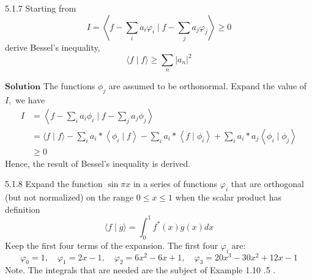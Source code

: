 \documentclass{article}
\begin{document}
\begin{flushleft}
\newpage



\begin{mybox}{5.1.7}
Starting from 
$$I=\left\langle f-\sum_{i} a_{i} \varphi_{i} \mid f-\sum_{j} a_{j} \varphi_{j}\right\rangle \geq 0$$
derive Bessel's inequality, 
$$\langle f \mid f\rangle \geq \sum_{n}\left|a_{n}\right|^{2}$$
\end{mybox}

$\boxed{\textbf{Solution}}$ The functions $\phi_{j}$ are assumed to be orthonormal.
Expand the value of $I,$ we have
$$\begin{aligned} I &=\left\langle f-\sum_{i} a_{i} \phi_{i} \mid f-\sum_{j} a_{j} \phi_{j}\right\rangle \\ &=\langle f \mid f\rangle-\sum_{i} a_{i} *\left\langle\phi_{i} \mid f\right\rangle-\sum_{i} a_{i} *\left\langle f \mid \phi_{i}\right\rangle+\sum_{i} a_{i} * a_{j}\left\langle\phi_{i} \mid \phi_{j}\right\rangle \\ & \geq 0 \end{aligned}$$
Hence, the result of Bessel's inequality is derived.

\newpage

\begin{mybox}{5.1.8}
Expand the function $\sin \pi x$ in a series of functions $\varphi_{i}$ that are orthogonal (but not normalized) on the range $0 \leq x \leq 1$ when the scalar product has definition
$$
\langle f \mid g\rangle=\int_{0}^{1} f^{*}(x) g(x) d x
$$
Keep the first four terms of the expansion. The first four $\varphi_{i}$ are:
$$
\varphi_{0}=1, \quad \varphi_{1}=2 x-1, \quad \varphi_{2}=6 x^{2}-6 x+1, \quad \varphi_{3}=20 x^{3}-30 x^{2}+12 x-1
$$
Note. The integrals that are needed are the subject of Example 1.10 .5 .
\end{mybox}


\end{flushleft}
\end{document}
